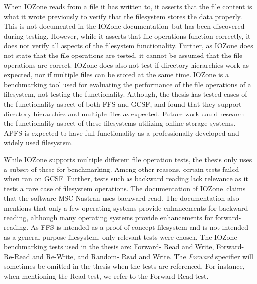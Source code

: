 When IOZone reads from a file it has written to, it asserts that the file content is what it wrote previously to verify that the filesystem stores the data properly. This is not documented in the IOZone documentation\,\cite{iozoneIozoneFilesystemBenchmark} but has been discovered during testing. However, while it asserts that file operations function correctly, it does not verify all aspects of the filesystem functionality. Further, as IOZone does not state that the file operations are tested, it cannot be assumed that the file operations are correct. IOZone does also not test if directory hierarchies work as expected, nor if multiple files can be stored at the same time. IOZone is a benchmarking tool used for evaluating the performance of the file operations of a filesystem, not testing the functionality. Although, the thesis has tested cases of the functionality aspect of both \gls{FFS} and \gls{GCSF}, and found that they support directory hierarchies and multiple files as expected. Future work could research the functionality aspect of these filesystems utilizing online storage systems. \gls{APFS} is expected to have full functionality as a professionally developed and widely used filesystem.

While IOZone supports multiple different file operation tests, the thesis only uses a subset of these for benchmarking. Among other reasons, certain tests failed when ran on \gls{GCSF}. Further, tests such as backward reading lack relevance as it tests a rare case of filesystem operations. The documentation of IOZone\,\cite{iozoneIozoneFilesystemBenchmark} claims that the software MSC Nastran uses backward-read. The documentation also mentions that only a few operating systems provide enhancements for backward reading, although many operating systems provide enhancements for forward-reading. As \gls{FFS} is intended as a proof-of-concept filesystem and is not intended as a general-purpose filesystem, only relevant tests were chosen. The IOZone benchmarking tests used in the thesis are: Forward- Read and Write, Forward- Re-Read and Re-Write, and Random- Read and Write. The \textit{Forward} specifier will sometimes be omitted in the thesis when the tests are referenced. For instance, when mentioning the Read test, we refer to the Forward Read test.


